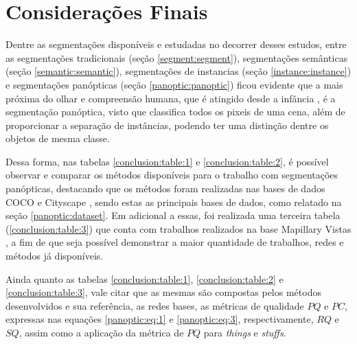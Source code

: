 \newpage
\section{Considerações Finais}
\label{final:final}

Dentre as segmentações disponíveis e estudadas no decorrer desses estudos, entre as segmentações tradicionais (seção \ref{segment:segment}), segmentações semânticas (seção \ref{semantic:semantic}), segmentações de instancias (seção \ref{instance:instance}) e segmentações panópticas (seção \ref{panoptic:panoptic}) ficou evidente que a mais próxima do olhar e compreensão humana, que é atingido desde a infância \cite{Mohan2020}, é a segmentação panóptica, visto que classifica todos os pixeis de uma cena, além de proporcionar a separação de instâncias, podendo ter uma distinção dentre os objetos de mesma classe.

Dessa forma, nas tabelas \ref{conclusion:table:1} e \ref{conclusion:table:2}, é possível observar e comparar os métodos disponíveis para o trabalho com segmentações panópticas, destacando que os métodos foram realizadas nas bases de dados COCO \cite{Lin2014} e Cityscape \cite{Cordts2016}, sendo estas as principais bases de dados, como relatado na seção \ref{panoptic:dataset}. Em adicional a essas, foi realizada uma terceira tabela (\ref{conclusion:table:3}) que conta com trabalhos realizados na base Mapillary Vistas \cite{Neuhold2017_ICCV}, a fim de que seja possível demonstrar a maior quantidade de trabalhos, redes e métodos já disponíveis.

Ainda quanto as tabelas \ref{conclusion:table:1}, \ref{conclusion:table:2} e \ref{conclusion:table:3}, vale citar que as mesmas são compostas pelos métodos desenvolvidos e sua referência, as redes bases, as métricas de qualidade $PQ$ e $PC$, expressas nas equações \ref{panoptic:eq:1} e \ref{panoptic:eq:3}, respectivamente, $RQ$ e $SQ$, assim como a aplicação da métrica de $PQ$ para \textit{things} e \textit{stuffs}.

